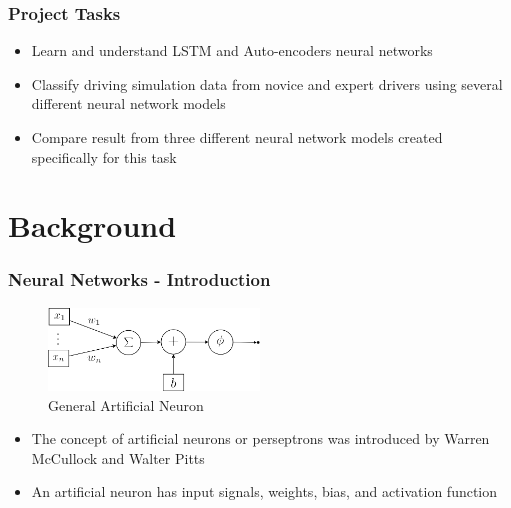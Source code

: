 \documentclass{beamer}
\begin{document}
\begin{frame}
\frametitle{Project Tasks}
\begin{itemize}
\item Learn and understand LSTM and Auto-encoders neural networks
\item Classify driving simulation data from novice and expert drivers using several different neural network models
\item Compare result from three different neural network models created specifically for this task
\end{itemize}
\end{frame}


\section{Background}
\begin{frame}
\frametitle{Neural Networks - Introduction}
\begin{figure}[t!]
    \centering
    \includegraphics[width=0.5\textwidth]{../paper/pictures/figures/general_AN.png}
    \caption{General Artificial Neuron}
    \label{fig:general_AN}
\end{figure}

\begin{itemize}
\item The concept of artificial neurons or perseptrons was introduced by Warren McCullock and Walter Pitts \cite{raschka2015python}
\item An artificial neuron has input signals, weights, bias, and activation function
\end{itemize}
\end{frame}
\end{document}
